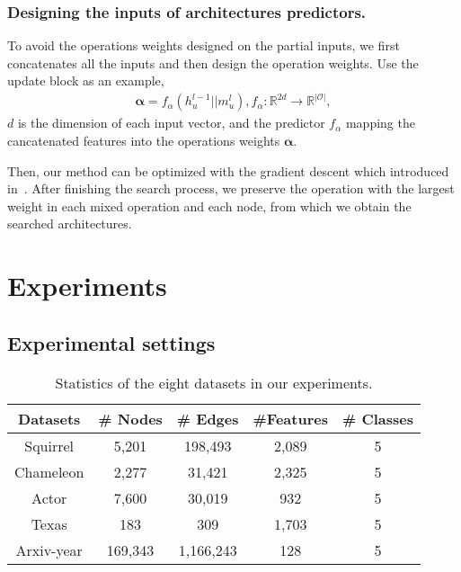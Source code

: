 \documentclass[sigconf]{acmart}
\def\bal{\bm{\alpha}}
\begin{document}
\subsubsection{Designing the inputs of architectures predictors.}
To avoid the operations weights designed on the partial inputs, we first concatenates all the inputs and then design the operation weights.
Use the update block as an example, 
\begin{align}
		\bm{\alpha}=f_{\alpha}(h_u^{l-1}||m_u^l), f_{\alpha}: \mathbb{R}^{2d} \rightarrow \mathbb{R}^{|\mathcal{O}|}, 
\end{align}
$d$ is the dimension of each input vector, and the predictor $f_{\alpha}$ mapping the cancatenated features into the operations weights $\bal$.

Then, our method can be optimized with the gradient descent which introduced in~\cite{liu2018darts,xie2018snas}. After finishing the search process, we preserve the operation with the largest weight in each mixed operation and each node, from which we obtain the searched architectures.












\section{Experiments}
\subsection{Experimental settings} 


\begin{table}[]
	\caption{Statistics of the eight datasets in our experiments.}
	\label{tb-statistic}
	\begin{tabular}{c|c|c|c|c}
		\hline
		Datasets       & \# Nodes  & \# Edges   & \#Features  & \# Classes\\ \hline
		Squirrel   & 5,201   & 198,493   & 2,089  & 5 \\ \hline
		Chameleon  & 2,277   & 31,421    & 2,325  & 5 \\ \hline
		Actor      & 7,600   & 30,019    & 932    & 5 \\ \hline
		Texas      & 183     & 309       & 1,703  & 5 \\ \hline
Arxiv-year & 169,343 & 1,166,243 & 128    & 5 \\ \hline
	\end{tabular}
\end{table} 
\end{document}
